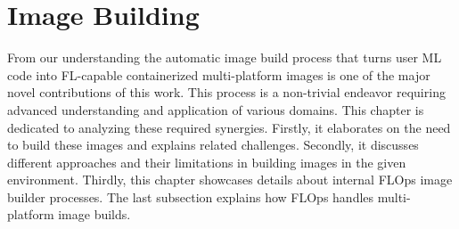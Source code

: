 \section{Image Building}

From our understanding the automatic image build process that turns user ML code into FL-capable containerized multi-platform images is one of the major novel contributions of this work.
This process is a non-trivial endeavor requiring advanced understanding and application of various domains.
This chapter is dedicated to analyzing these required synergies.
Firstly, it elaborates on the need to build these images and explains related challenges.
Secondly, it discusses different approaches and their limitations in building images in the given environment.
Thirdly, this chapter showcases details about internal FLOps image builder processes.
The last subsection explains how FLOps handles multi-platform image builds.












